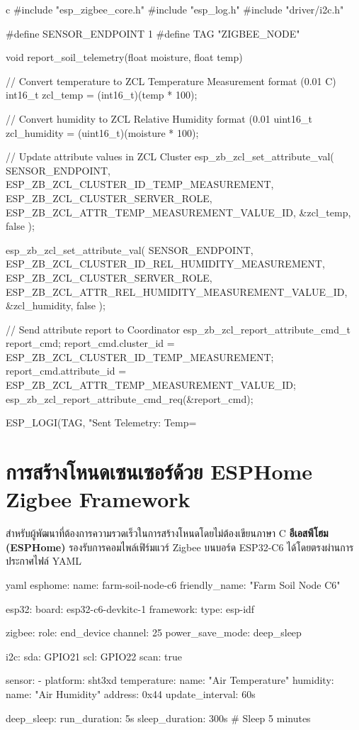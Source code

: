 \begin{codebox}{c}
#include "esp_zigbee_core.h"
#include "esp_log.h"
#include "driver/i2c.h"

#define SENSOR_ENDPOINT 1
#define TAG "ZIGBEE_NODE"

void report_soil_telemetry(float moisture, float temp) {
    // Convert temperature to ZCL Temperature Measurement format (0.01 C)
    int16_t zcl_temp = (int16_t)(temp * 100);
    
    // Convert humidity to ZCL Relative Humidity format (0.01 %
    uint16_t zcl_humidity = (uint16_t)(moisture * 100);

    // Update attribute values in ZCL Cluster
    esp_zb_zcl_set_attribute_val(
        SENSOR_ENDPOINT,
        ESP_ZB_ZCL_CLUSTER_ID_TEMP_MEASUREMENT,
        ESP_ZB_ZCL_CLUSTER_SERVER_ROLE,
        ESP_ZB_ZCL_ATTR_TEMP_MEASUREMENT_VALUE_ID,
        &zcl_temp,
        false
    );

    esp_zb_zcl_set_attribute_val(
        SENSOR_ENDPOINT,
        ESP_ZB_ZCL_CLUSTER_ID_REL_HUMIDITY_MEASUREMENT,
        ESP_ZB_ZCL_CLUSTER_SERVER_ROLE,
        ESP_ZB_ZCL_ATTR_REL_HUMIDITY_MEASUREMENT_VALUE_ID,
        &zcl_humidity,
        false
    );

    // Send attribute report to Coordinator
    esp_zb_zcl_report_attribute_cmd_t report_cmd;
    report_cmd.cluster_id = ESP_ZB_ZCL_CLUSTER_ID_TEMP_MEASUREMENT;
    report_cmd.attribute_id = ESP_ZB_ZCL_ATTR_TEMP_MEASUREMENT_VALUE_ID;
    esp_zb_zcl_report_attribute_cmd_req(&report_cmd);
    
    ESP_LOGI(TAG, "Sent Telemetry: Temp=%
}
\end{codebox}

\section{การสร้างโหนดเซนเซอร์ด้วย ESPHome Zigbee Framework}

สำหรับผู้พัฒนาที่ต้องการความรวดเร็วในการสร้างโหนดโดยไม่ต้องเขียนภาษา C \textbf{อีเอสพีโฮม (ESPHome)} รองรับการคอมไพล์เฟิร์มแวร์ Zigbee บนบอร์ด ESP32-C6 ได้โดยตรงผ่านการประกาศไฟล์ YAML

\begin{codebox}{yaml}
esphome:
  name: farm-soil-node-c6
  friendly_name: "Farm Soil Node C6"

esp32:
  board: esp32-c6-devkitc-1
  framework:
    type: esp-idf

zigbee:
  role: end_device
  channel: 25
  power_save_mode: deep_sleep

i2c:
  sda: GPIO21
  scl: GPIO22
  scan: true

sensor:
  - platform: sht3xd
    temperature:
      name: "Air Temperature"
    humidity:
      name: "Air Humidity"
    address: 0x44
    update_interval: 60s

deep_sleep:
  run_duration: 5s
  sleep_duration: 300s # Sleep 5 minutes
\end{codebox}

